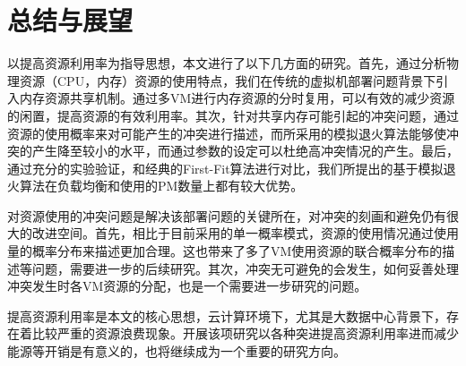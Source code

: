 \chapter{总结与展望}
以提高资源利用率为指导思想，本文进行了以下几方面的研究。首先，通过分析物理资源（CPU，内存）资源的使用特点，我们在传统的虚拟机部署问题背景下引入内存资源共享机制。通过多VM进行内存资源的分时复用，可以有效的减少资源的闲置，提高资源的有效利用率。其次，针对共享内存可能引起的冲突问题，通过资源的使用概率来对可能产生的冲突进行描述，而所采用的模拟退火算法能够使冲突的产生降至较小的水平，而通过参数的设定可以杜绝高冲突情况的产生。最后，通过充分的实验验证，和经典的First-Fit算法进行对比，我们所提出的基于模拟退火算法在负载均衡和使用的PM数量上都有较大优势。

对资源使用的冲突问题是解决该部署问题的关键所在，对冲突的刻画和避免仍有很大的改进空间。首先，相比于目前采用的单一概率模式，资源的使用情况通过使用量的概率分布来描述更加合理。这也带来了多了VM使用资源的联合概率分布的描述等问题，需要进一步的后续研究。其次，冲突无可避免的会发生，如何妥善处理冲突发生时各VM资源的分配，也是一个需要进一步研究的问题。

提高资源利用率是本文的核心思想，云计算环境下，尤其是大数据中心背景下，存在着比较严重的资源浪费现象。开展该项研究以各种突进提高资源利用率进而减少能源等开销是有意义的，也将继续成为一个重要的研究方向。